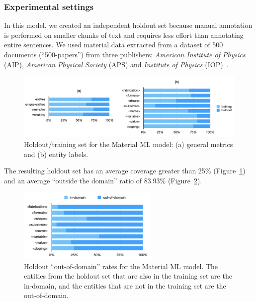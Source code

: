 \subsubsection{Experimental settings}

In this model, we created an independent holdout set because manual annotation is performed on smaller chunks of text and requires less effort than annotating entire sentences.
We used material data extracted from a dataset of 500 documents (``500-papers'') from three publishers: \textit{American Institute of Physics} (AIP), \textit{American Physical Society} (APS) and \textit{Institute of Physics} (IOP)~\cite{foppiano2019proposal}.

\begin{figure}[ht]
    \centering
    \includegraphics[width=\textwidth]{figures/automatic_extraction_supercon/material-holdout-training-set}
    \caption{Holdout/training set for the Material ML model: (a) general metrics and (b) entity labels.}
    \label{fig:material-training-holdout-set-distribution}
\end{figure}

The resulting holdout set has an average coverage greater than 25\% (Figure~\ref{fig:material-training-holdout-set-distribution}) and an average ``outside the domain'' ratio of 83.93\% (Figure~\ref{fig:material-out-domain-holdout}).

\begin{figure}[ht]
    \centering
    \includegraphics[width=0.6\textwidth]{figures/automatic_extraction_supercon/material-out-domain-holdout-unique}
    \caption{Holdout ``out-of-domain'' rates for the Material ML model. The entities from the holdout set that are also in the training set are the in-domain, and the entities that are not in the training set are the out-of-domain.}
    \label{fig:material-out-domain-holdout}
\end{figure}


